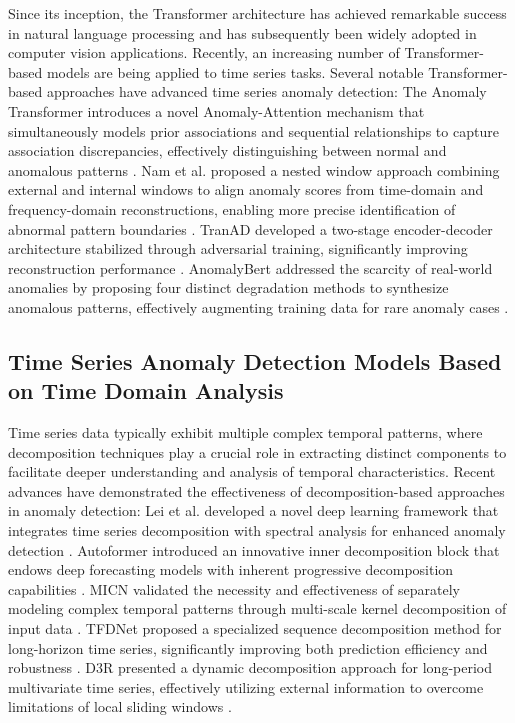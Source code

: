 \documentclass[sigconf]{acmart}
\begin{document}
Since its inception, the Transformer architecture has achieved remarkable success in natural 
language processing and has subsequently been widely adopted in computer vision applications. 
Recently, an increasing number of Transformer-based models are being applied to time series tasks.
Several notable Transformer-based approaches have advanced time series anomaly detection:
The Anomaly Transformer introduces a novel Anomaly-Attention mechanism that simultaneously models prior 
associations and sequential relationships to capture association discrepancies, effectively distinguishing 
between normal and anomalous patterns \cite{xu2021anomaly}.
Nam et al. proposed a nested window approach combining external and internal windows to align anomaly 
scores from time-domain and frequency-domain reconstructions, enabling more precise identification of abnormal pattern boundaries \cite{nam2024breaking}.
TranAD developed a two-stage encoder-decoder architecture stabilized through adversarial training, 
significantly improving reconstruction performance \cite{tuli2022tranad}.
AnomalyBert addressed the scarcity of real-world anomalies by proposing four distinct degradation methods to synthesize anomalous patterns, 
effectively augmenting training data for rare anomaly cases \cite{jeong2023anomalybert}.

\subsection{Time Series Anomaly Detection Models Based on Time Domain Analysis}

Time series data typically exhibit multiple complex temporal patterns, 
where decomposition techniques play a crucial role in extracting distinct components to facilitate deeper 
understanding and analysis of temporal characteristics. Recent advances have demonstrated the 
effectiveness of decomposition-based approaches in anomaly detection:
Lei et al. developed a novel deep learning framework that 
integrates time series decomposition with spectral analysis for enhanced anomaly detection \cite{lei2023novel}.
Autoformer introduced an innovative inner decomposition block that endows deep forecasting 
models with inherent progressive decomposition capabilities \cite{wu2021autoformer}.
MICN validated the necessity and effectiveness of separately modeling complex temporal patterns 
through multi-scale kernel decomposition of input data \cite{wang2023micn}.
TFDNet proposed a specialized sequence decomposition method for long-horizon time series, 
significantly improving both prediction efficiency and robustness \cite{luo2025tfdnet}.
D3R presented a dynamic decomposition approach for long-period multivariate time series, 
effectively utilizing external information to overcome limitations of local sliding windows \cite{wang2023drift}.
\end{document}
